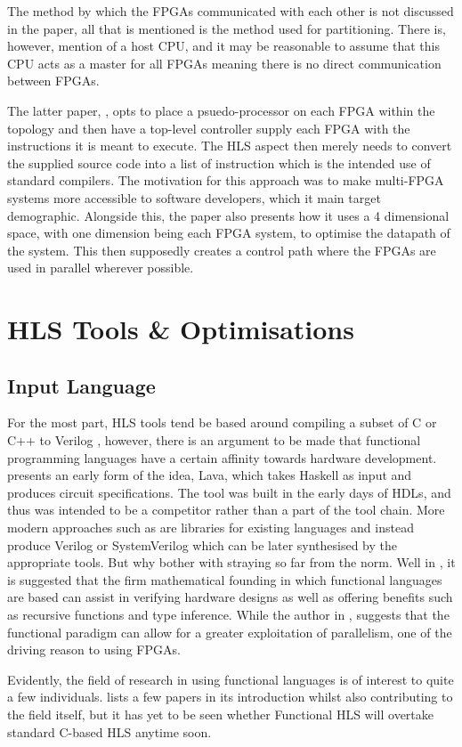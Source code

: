 The method by which the FPGAs communicated with each other is not discussed in the paper, all that is mentioned is the method used for partitioning. There is, however, mention of a host CPU, and it may be reasonable to assume that this CPU acts as a master for all FPGAs meaning there is no direct communication between FPGAs.

The latter paper, \cite{707888}, opts to place a psuedo-processor on each FPGA within the topology and then have a top-level controller supply each FPGA with the instructions it is meant to execute. The HLS aspect then merely needs to convert the supplied source code into a list of instruction which is the intended use of standard compilers. The motivation for this approach was to make multi-FPGA systems more accessible to software developers, which it main target demographic. Alongside this, the paper also presents how it uses a 4 dimensional space, with one dimension being each FPGA system, to optimise the datapath of the system. This then supposedly creates a control path where the FPGAs are used in parallel wherever possible.

\section{HLS Tools \& Optimisations}

\subsection{Input Language}

For the most part, HLS tools tend be based around compiling a subset of C or C++ to Verilog \cite{7368920}, however, there is an argument to be made that functional programming languages have a certain affinity towards hardware development. \cite{bjesse1998lava} presents an early form of the idea, Lava, which takes Haskell as input and produces circuit specifications. The tool was built in the early days of HDLs, and thus was intended to be a competitor rather than a part of the tool chain. More modern approaches such as \cite{hardcaml} are libraries for existing languages and instead produce Verilog or SystemVerilog which can be later synthesised by the appropriate tools. But why bother with straying so far from the norm. Well in \cite{7331371}, it is suggested that the firm mathematical founding in which functional languages are based can assist in verifying hardware designs as well as offering benefits such as recursive functions and type inference. While the author in \cite{Edwards2019FHWP}, suggests that the functional paradigm can allow for a greater exploitation of parallelism, one of the driving reason to using FPGAs. 

Evidently, the field of research in using functional languages is of interest to quite a few individuals. \cite{7723553} lists a few papers in its introduction whilst also contributing to the field itself, but it has yet to be seen whether Functional HLS will overtake standard C-based HLS anytime soon.





